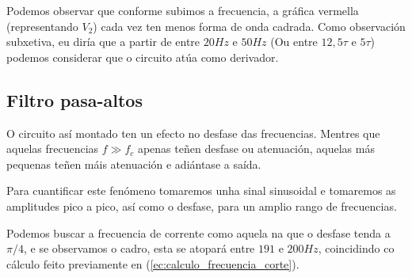 \documentclass[12pt, a4paper, titlepage]{article}
\begin{document}
    Podemos observar que conforme subimos a frecuencia, a gráfica vermella (representando $V_2$) cada vez ten menos forma de onda cadrada.
    Como observación subxetiva, eu diría que a partir de entre $20Hz$ e $50Hz$ (Ou entre $12,5\tau$ e $5\tau$) podemos considerar que o circuito atúa como derivador.

    \subsection{Filtro pasa-altos}

    O circuito así montado ten un efecto no desfase das frecuencias. Mentres que aquelas frecuencias $f \gg f_c$ apenas teñen desfase ou atenuación, aquelas más pequenas teñen máis atenuación e adiántase a saída.

    Para cuantificar este fenómeno tomaremos unha sinal sinusoidal e tomaremos as amplitudes pico a pico, así como o desfase, para un amplio rango de frecuencias.
    
    Podemos buscar a frecuencia de corrente como aquela na que o desfase tenda a $\pi/4$, e se observamos o cadro, esta se atopará entre $191$ e $200 Hz$, coincidindo co cálculo feito previamente en (\ref{ec:calculo_frecuencia_corte}).
\end{document}
